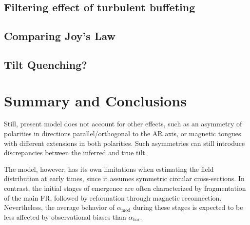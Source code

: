 \documentclass[namedreferences,hyperref,optionalrh]{spr-sola}
\newcommand{\mpc}[1]{{\bf \color{blue}{[Mariano comment: #1]}}}
\newcommand{\pc}[1]{{\color{ForestGreen}{P comment: #1}}}
\begin{document}
  \subsection{Filtering effect of turbulent buffeting}
      \label{S-filter}

\mpc{Reducing outliers assuming a latitudinal dependence $\propto \sin (\theta)$}


\subsection{Comparing Joy's Law}
\label{S-Joy}

\mpc{Comparative for different moments of the AR emergence}





 
\subsection{Tilt Quenching?}
 \label{S-Quenching}

\mpc{Tilt dependence of the Flux Strength?}






\section{Summary and Conclusions} %
\label{S-conclusions}




\pc{The following limitations can be kept for the conclusion, calling for an extension of the model. Here it is too much lowering the usefulness of the method:} Still, present model does not account for other effects, such as an asymmetry of polarities in directions parallel/orthogonal to the AR axis, or magnetic tongues with different extensions in both polarities.
Such asymmetries can still introduce discrepancies between the inferred and true tilt. 


 \pc{This is more for a discussion section:}
The model, however, has its own limitations when estimating the field distribution at early times, since it assumes symmetric circular cross-sections. In contrast, the initial stages of emergence are often characterized by fragmentation of the main FR, followed by reformation through magnetic reconnection. Nevertheless, the average behavior of $\alpha_\mathrm{mod}$ during these stages is expected to be less affected by observational biases than $\alpha_\mathrm{bar}$.  \pc{because remove tongue effects?}
\end{document}
